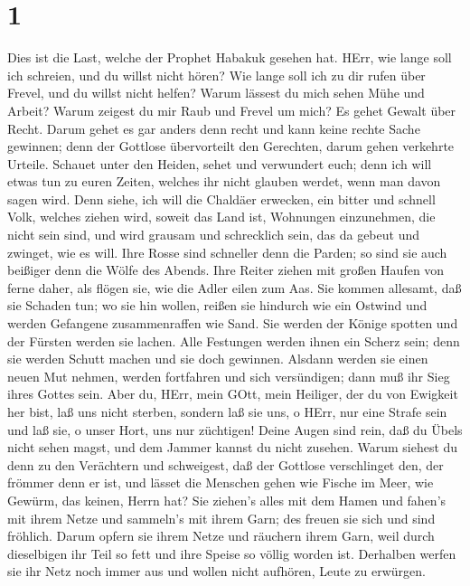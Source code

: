 \hypertarget{section}{%
\section{1}\label{section}}

 Dies ist die Last, welche der Prophet Habakuk gesehen hat.
 HErr, wie lange soll ich schreien, und du willst nicht
hören? Wie lange soll ich zu dir rufen über Frevel, und du willst nicht
helfen?  Warum lässest du mich sehen Mühe und Arbeit? Warum
zeigest du mir Raub und Frevel um mich? Es gehet Gewalt über Recht.
 Darum gehet es gar anders denn recht und kann keine rechte
Sache gewinnen; denn der Gottlose übervorteilt den Gerechten, darum
gehen verkehrte Urteile.  Schauet unter den Heiden, sehet
und verwundert euch; denn ich will etwas tun zu euren Zeiten, welches
ihr nicht glauben werdet, wenn man davon sagen wird.  Denn
siehe, ich will die Chaldäer erwecken, ein bitter und schnell Volk,
welches ziehen wird, soweit das Land ist, Wohnungen einzunehmen, die
nicht sein sind,  und wird grausam und schrecklich sein, das
da gebeut und zwinget, wie es will.  Ihre Rosse sind
schneller denn die Parden; so sind sie auch beißiger denn die Wölfe des
Abends. Ihre Reiter ziehen mit großen Haufen von ferne daher, als flögen
sie, wie die Adler eilen zum Aas.  Sie kommen allesamt, daß
sie Schaden tun; wo sie hin wollen, reißen sie hindurch wie ein Ostwind
und werden Gefangene zusammenraffen wie Sand.  Sie werden
der Könige spotten und der Fürsten werden sie lachen. Alle Festungen
werden ihnen ein Scherz sein; denn sie werden Schutt machen und sie doch
gewinnen.  Alsdann werden sie einen neuen Mut nehmen,
werden fortfahren und sich versündigen; dann muß ihr Sieg ihres Gottes
sein.  Aber du, HErr, mein GOtt, mein Heiliger, der du von
Ewigkeit her bist, laß uns nicht sterben, sondern laß sie uns, o HErr,
nur eine Strafe sein und laß sie, o unser Hort, uns nur züchtigen!
 Deine Augen sind rein, daß du Übels nicht sehen magst, und
dem Jammer kannst du nicht zusehen. Warum siehest du denn zu den
Verächtern und schweigest, daß der Gottlose verschlinget den, der
frömmer denn er ist,  und lässet die Menschen gehen wie
Fische im Meer, wie Gewürm, das keinen, Herrn hat?  Sie
ziehen's alles mit dem Hamen und fahen's mit ihrem Netze und sammeln's
mit ihrem Garn; des freuen sie sich und sind fröhlich. 
Darum opfern sie ihrem Netze und räuchern ihrem Garn, weil durch
dieselbigen ihr Teil so fett und ihre Speise so völlig worden ist.
 Derhalben werfen sie ihr Netz noch immer aus und wollen
nicht aufhören, Leute zu erwürgen.

